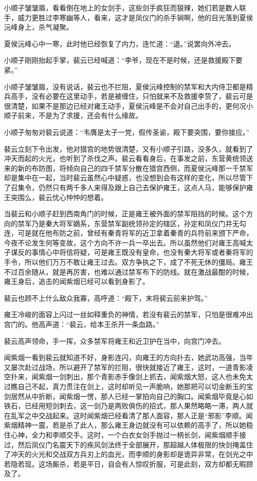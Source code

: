 小顺子皱皱眉，看看倒在地上的女剑手，这些剑手疯狂而狠辣，她们若是数人联手，威力更胜过李寒幽等人，看来，这才是凤仪门的杀手锏啊，他的目光落到夏侯沅峰身上，杀气凝聚。

夏侯沅峰心中一寒，此时他已经恢复了内力，连忙道：“退。”说罢向外冲去。

小顺子刚刚抬起手掌，裴云已经喊道：“李爷，现在不是时候，还是救援殿下要紧。”

小顺子皱皱眉，没有说话，裴云也不拦阻，夏侯沅峰控制的禁军和大内侍卫都是精兵高手，没有必要在这里动手，若是被缠住，只怕就来不及救援李贽了，裴云可是很清楚，如果不是那边已经对雍王动手，夏侯沅峰是不会对自己出手的，更何况小顺子前来，不是为了求援，还会有什么缘故。

小顺子匆匆对裴云说道：“韦膺是太子一党，假传圣谕，殿下要突围，要你接应。”

裴云立刻下令出发，他对猎宫的地势很清楚，又有小顺子引路，没多久，就看到了冲天而起的火光，也听到了杀伐之声。裴云看看身后，在事发之前，东营黄统领送来的新的布防图，将倾向自己的四千禁军分散在猎宫西侧，而夏侯沅峰那一千禁军却是集中在一起，当时裴云虽然心中疑惑，也没想到会有这样的变化，所以尽管下了召集令，仍然只有两千多人来得及跟上自己去保护雍王，这点人马，能够保护雍王突围么，裴云忧心忡忡的想着。

当裴云和小顺子赶到西南角门的时候，正是雍王被外面的禁军阻挡的时候。这个方向的禁军乃是秦大将军嫡系，东营禁军副统领孙定的辖区，孙定和凤仪门并无勾连，可是就在他布防之前，曾经有秦青将军的近卫拿着秦青的兵符前来颁下严命，今夜不论发生何等变故，这个方向不许一兵一卒出去。所以虽然他们对雍王高喊太子谋反的事情心中将信将疑，可是雍王既没有皇命，也没有秦大将军或者秦将军的手令，所以他们万万不敢让雍王过去。双方争执之下，成了不死无休的僵局。雍王不过百余随从，就是再厉害，也难以通过禁军布下的防线。就在激战最酣的时候，雍王身后，追击的闻紫烟已经可以看到身影了。

裴云也顾不上什么敌众我寡，高呼道：“殿下，末将裴云前来护驾。”

雍王冷峻的面容上闪过一丝如释重负的神情，若没有裴云的禁军，只怕是很难冲出宫门的。他高声道：“裴云，给本王杀开一条血路。”

裴云高声领命，手一挥，众多禁军将雍王和近卫护在当中，向宫门冲去。

闻紫烟一看到裴云就知道不好，身影连闪，向雍王的方向扑去，她武功高强，当年又屡次赴过战场，所以避开了禁军的拦阻，很快就接近了雍王，这时，一道青影凌空扑来，闻紫烟一剑刺出，那个青影赤手像剑上抓去，闻紫烟大怒，这人也未免太过瞧自己不起，真力贯注在剑上，这时却听见一声脆响，她那把可以切金断玉的宝剑居然从中折断，闻紫烟一愣，那人已经一掌拍向自己的胸口。闻紫烟毕竟是心如铁石，已经用短剑刺去，这一剑乃是两败俱伤的招式，那人果然略略一滞，两人就在乱军之中交战起来。这时闻紫烟已经看清了那人面容，那人正是“邪影”李顺。闻紫烟精神一震，若是杀了此人，那么雍王身边就没有可以依赖的高手了，所以她稳住心神，全力和李顺交手。这时，一个白衣女剑手抛过一柄长剑，闻紫烟顺手接过，然后凤仪门名震天下的疾风剑法终于全部展开，那超越人体极限的快剑掩盖住了冲天的火光和交战双方兵刃上的血光，而李顺的身影却是诡异非常，在剑光之中若隐若现。这场厮杀，若是平日，自会有人惊叹折服，可是此刻，双方却都无暇顾及了。


